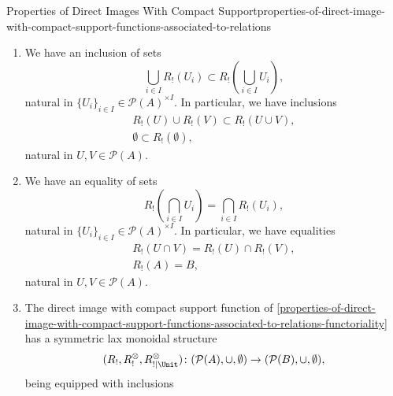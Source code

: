 \begin{proposition}{Properties of Direct Images With Compact Support}{properties-of-direct-image-with-compact-support-functions-associated-to-relations}
\begin{enumerate}
\begin{itemize}
\begin{itemize}
                    \end{itemize}
            \end{itemize}
        \item\label{properties-of-direct-image-with-compact-support-functions-associated-to-relations-lax-preservation-of-colimits}We have an inclusion of sets
            \[
                \bigcup_{i\in I}R_{!}(U_{i})%
                \subset%
                R_{!}(\bigcup_{i\in I}U_{i}),%
            \]%
            natural in $\{U_{i}\}_{i\in I}\in\mathcal{P}(A)^{\times I}$. In particular, we have inclusions%
            \[
                \begin{gathered}
                    R_{!}(U)\cup R_{!}(V) \subset R_{!}(U\cup V),\\
                    \emptyset             \subset R_{!}(\emptyset),
                \end{gathered}
            \]%
            natural in $U,V\in\mathcal{P}(A)$.
        \item\label{properties-of-direct-image-with-compact-support-functions-associated-to-relations-preservation-of-limits}We have an equality of sets
            \[
                    R_{!}(\bigcap_{i\in I}U_{i})%
                    =%
                    \bigcap_{i\in I}R_{!}(U_{i}),%
            \]%
            natural in $\{U_{i}\}_{i\in I}\in\mathcal{P}(A)^{\times I}$. In particular, we have equalities%
            \[
                \begin{gathered}
                    R_{!}(U\cap V) = R_{!}(U)\cap R_{!}(V),\\
                    R_{!}(A)       = B,
                \end{gathered}
            \]%
            natural in $U,V\in\mathcal{P}(A)$.
        \item\label{properties-of-direct-image-with-compact-support-functions-associated-to-relations-symmetric-lax-monoidality-with-respect-to-unions}The direct image with compact support function of \cref{properties-of-direct-image-with-compact-support-functions-associated-to-relations-functoriality} has a symmetric lax monoidal structure
            \[
                (R_{!},R^{\otimes}_{!},R^{\otimes}_{!|\Unit})
                \colon
                (\mathcal{P}(A),\cup,\emptyset)
                \to
                (\mathcal{P}(B),\cup,\emptyset),
            \]%
            being equipped with inclusions%

\end{enumerate}
\end{proposition}
